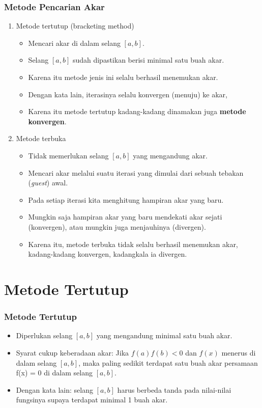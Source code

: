 \documentclass[pdflatex,compress]{beamer}
\begin{document}
\begin{frame}
	\frametitle{Metode Pencarian Akar}
	\begin{enumerate}
		\item Metode tertutup (bracketing method)
		\begin{itemize}
			\item Mencari akar di dalam selang $ [a, b] $.
			\item Selang $ [a, b] $ sudah dipastikan berisi minimal satu buah akar.
			\item Karena itu metode jenis ini selalu berhasil menemukan akar.
			\item Dengan kata lain, iterasinya selalu konvergen (menuju) ke akar,
			\item Karena itu metode tertutup kadang-kadang dinamakan juga \textbf{metode konvergen}.
		\end{itemize}
	\end{enumerate}
\end{frame}

\begin{frame}
	\begin{enumerate}
		\setcounter{enumi}{1}
		\item Metode terbuka
		\begin{itemize}
			\item Tidak memerlukan selang $ [a, b] $ yang mengandung akar.
			\item Mencari akar melalui suatu iterasi yang dimulai
			dari sebuah tebakan (\textit{guest}) awal.
			\item Pada setiap iterasi kita menghitung hampiran akar yang baru.
			\item Mungkin saja hampiran akar yang baru mendekati akar sejati (konvergen), atau mungkin juga menjauhinya (divergen).
			\item Karena itu, metode terbuka tidak selalu berhasil menemukan akar, kadang-kadang konvergen, kadangkala ia divergen.
		\end{itemize}
	\end{enumerate}
\end{frame}

\section{Metode Tertutup}

\begin{frame}
	\frametitle{Metode Tertutup}
	\begin{itemize}
		\item Diperlukan selang $ [a, b] $ yang mengandung minimal satu buah akar.
		\item Syarat cukup keberadaan akar: Jika $ f(a) f(b) < 0 $ dan $ f(x) $ menerus di dalam selang $ [a, b] $, maka paling sedikit terdapat satu buah akar persamaan f(x) = 0 di dalam selang $ [a, b] $.
		\item Dengan kata lain: selang $ [a, b] $ harus berbeda tanda pada nilai-nilai fungsinya supaya terdapat minimal 1 buah akar.
	\end{itemize}
\end{frame}
\end{document}
